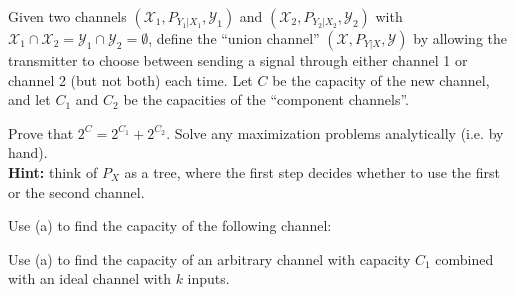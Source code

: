 \documentclass[a4paper,10pt,landscape,twocolumn]{scrartcl}
\begin{document}
\begin{exercise}
Given two channels $(\mathcal{X}_1, P_{Y_1|X_1}, \mathcal{Y}_1)$ and $(\mathcal{X}_2, P_{Y_2|X_2}, \mathcal{Y}_2)$ with $\mathcal{X}_1 \cap \mathcal{X}_2 = \mathcal{Y}_1 \cap \mathcal{Y}_2 = \emptyset$, define the ``union channel'' $(\mathcal{X}, P_{Y|X},\mathcal{Y})$ by allowing the transmitter to choose between sending a signal through either channel 1 or channel 2 (but not both) each time. Let $C$ be the capacity of the new channel, and let $C_1$ and $C_2$ be the capacities of the ``component channels''.
\begin{subex}[(4pt)]
Prove that $2^C = 2^{C_1} + 2^{C_2}$. Solve any maximization problems analytically (i.e. by hand).
\\\textbf{Hint:} think of $P_X$ as a tree, where the first step decides whether to use the first or the second channel.
\end{subex}

\begin{subex}[(1pt)]
Use (a) to find the capacity of the following channel:
\begin{center}
\end{center}
\end{subex}

\begin{subex}
Use (a) to find the capacity of an arbitrary channel with capacity $C_1$ combined with an ideal channel with $k$ inputs.
\end{subex}
\end{exercise}
\end{document}
